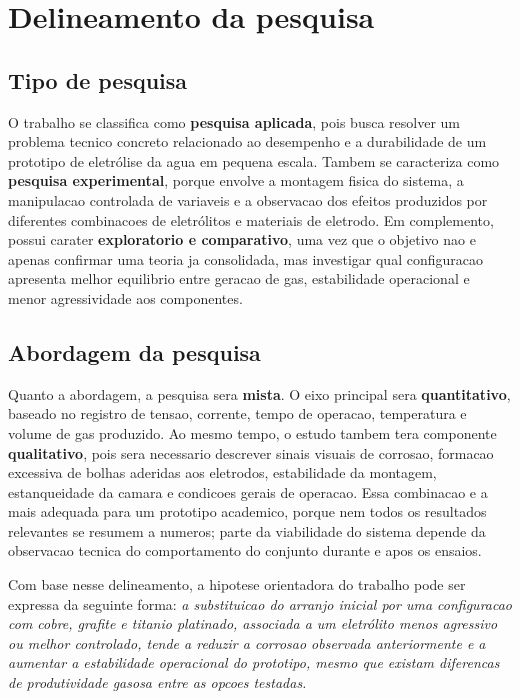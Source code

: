 \documentclass[12pt,oneside,a4paper,brazilian]{abntex2}
\begin{document}
\section{Delineamento da pesquisa}

\subsection{Tipo de pesquisa}

O trabalho se classifica como \textbf{pesquisa aplicada}, pois busca resolver um problema tecnico concreto relacionado ao desempenho e a durabilidade de um prototipo de eletrólise da agua em pequena escala. Tambem se caracteriza como \textbf{pesquisa experimental}, porque envolve a montagem fisica do sistema, a manipulacao controlada de variaveis e a observacao dos efeitos produzidos por diferentes combinacoes de eletrólitos e materiais de eletrodo. Em complemento, possui carater \textbf{exploratorio e comparativo}, uma vez que o objetivo nao e apenas confirmar uma teoria ja consolidada, mas investigar qual configuracao apresenta melhor equilibrio entre geracao de gas, estabilidade operacional e menor agressividade aos componentes.

\subsection{Abordagem da pesquisa}

Quanto a abordagem, a pesquisa sera \textbf{mista}. O eixo principal sera \textbf{quantitativo}, baseado no registro de tensao, corrente, tempo de operacao, temperatura e volume de gas produzido. Ao mesmo tempo, o estudo tambem tera componente \textbf{qualitativo}, pois sera necessario descrever sinais visuais de corrosao, formacao excessiva de bolhas aderidas aos eletrodos, estabilidade da montagem, estanqueidade da camara e condicoes gerais de operacao. Essa combinacao e a mais adequada para um prototipo academico, porque nem todos os resultados relevantes se resumem a numeros; parte da viabilidade do sistema depende da observacao tecnica do comportamento do conjunto durante e apos os ensaios.

Com base nesse delineamento, a hipotese orientadora do trabalho pode ser expressa da seguinte forma: \textit{a substituicao do arranjo inicial por uma configuracao com cobre, grafite e titanio platinado, associada a um eletrólito menos agressivo ou melhor controlado, tende a reduzir a corrosao observada anteriormente e a aumentar a estabilidade operacional do prototipo, mesmo que existam diferencas de produtividade gasosa entre as opcoes testadas.}
\end{document}
